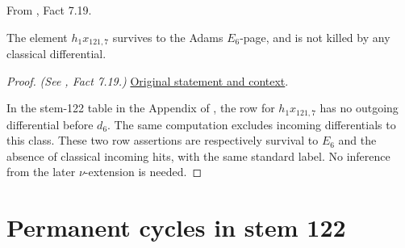 \begin{fact}
\label{paper:7.19}
From \cite{LWX126}, Fact 7.19.\par
\label{fact:h_1_mul_x_121_7}\label{fact:h1x1217}
    The element $h_1x_{121,7}$ survives to the Adams $E_6$-page, and is not killed by any classical differential.



\end{fact}
\begin{proof}
\textit{(See \cite{LWX126}, Fact 7.19.)} \href{paper/main.tex.html#L2613}{Original statement and context}.

In the stem-122 table in the Appendix of \cite{LWX126}, the row for $h_1x_{121,7}$ has no outgoing differential before $d_6$. The same computation excludes incoming differentials to this class. These two row assertions are respectively survival to $E_6$ and the absence of classical incoming hits, with the same standard label. No inference from the later $\nu$-extension is needed.
\end{proof}

\section{Permanent cycles in stem 122}

